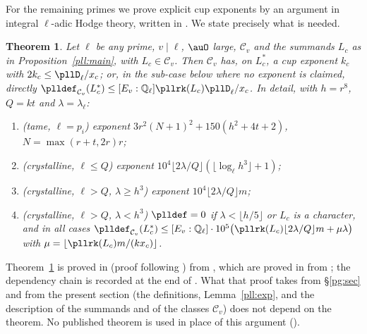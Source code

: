 \documentclass[10pt]{amsart}
\newtheorem{theorem}{Theorem}[section]
\theoremstyle{definition}
\theoremstyle{remark}
\newcommand{\Q}{\mathbb Q}
\begin{document}
For the remaining primes we prove explicit cup exponents by an argument in integral $\ell$-adic
Hodge theory, written in {\cite[\S\S2--9]{P56}}. We state precisely what is needed.

\begin{theorem}\label{pll:exponent}
Let $\ell$ be any prime, $v\mid\ell$, $\auO$ large, $\mathcal C_v$ and the summands $L_c$ as in
Proposition~\ref{pll:main}, with $L_c\in\mathcal C_v$. Then $\mathcal C_v$ has, on $L_c^*$, a cup
exponent $k_c$ with $2k_c\le\pllD_\ell/x_c$; or, in the sub-case below where no exponent is
claimed, directly $\plldef_{\mathcal C_v}(L_c^*)\le[E_v:\Q_\ell]\pllrk(L_c)\pllD_\ell/x_c$. In
detail, with $h=r^8$, $Q=kt$ and $\lambda=\lambda_\ell$:
\begin{enumerate}
\item[(a)] (tame, $\ell=p_i$) exponent $3r^2(N+1)^2+150(h^2+4t+2)$, $N=\max(r+t,2r)r$;
\item[(b)] (crystalline, $\ell\le Q$) exponent $10^4\lfloor2\lambda/Q\rfloor(\lfloor\log_\ell
h^3\rfloor+1)$;
\item[(c)] (crystalline, $\ell>Q$, $\lambda\ge h^3$) exponent $10^4\lfloor2\lambda/Q\rfloor m$;
\item[(d)] (crystalline, $\ell>Q$, $\lambda<h^3$) $\plldef=0$ if $\lambda<\lfloor h/5\rfloor$ or
$L_c$ is a character, and in all cases $\plldef_{\mathcal C_v}(L_c^*)\le
[E_v:\Q_\ell]\cdot10^5\bigl(\pllrk(L_c)\lfloor2\lambda/Q\rfloor m+\mu\lambda\bigr)$ with
$\mu=\lfloor\pllrk(L_c)m/(kx_c)\rfloor$.
\end{enumerate}
\end{theorem}

Theorem~\ref{pll:exponent} is proved in {\cite[\S2.3]{P56}} (proof following
{\cite[Theorem~2.13]{P56}}) from {\cite[Propositions~2.5--2.10]{P56}}, which are proved in
{\cite[\S\S7, 8.1 and~8.2]{P56}} from {\cite[\S\S3.1--9]{P56}}; the
dependency chain is recorded at the end of {\cite[\S2.2]{P56}}. What that proof takes from \S\ref{pg:sec} and from the present section (the definitions, Lemma~\ref{pll:exp}, and the description of the summands and of the classes $\mathcal C_v$) does not depend on the theorem. No published theorem is used in
place of this argument ({\cite[Remark~2.1]{P56}}).
\end{document}
